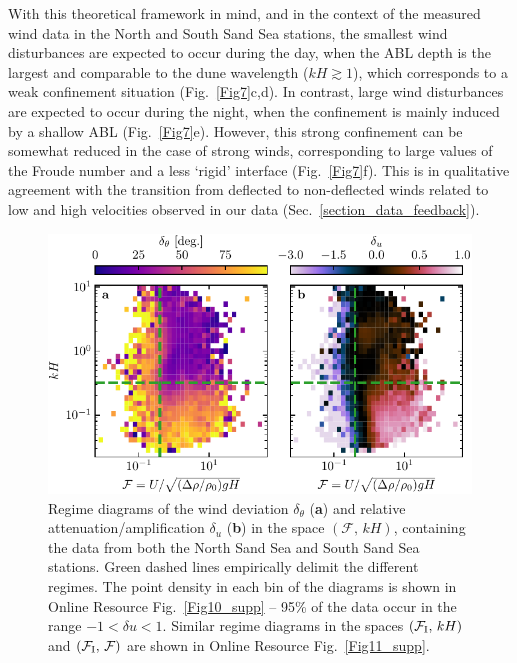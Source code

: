 With this theoretical framework in mind, and in the context of the measured wind data in the North and South Sand Sea stations, the smallest wind disturbances are expected to occur during the day, when the ABL depth is the largest and comparable to the dune wavelength ($k H \gtrsim 1$), which corresponds to a weak confinement situation (Fig.~\ref{Fig7}c,d). In contrast, large wind disturbances are expected to occur during the night, when the confinement is mainly induced by a shallow ABL (Fig.~\ref{Fig7}e). However, this strong confinement can be somewhat reduced in the case of strong winds, corresponding to large values of the Froude number and a less `rigid' interface (Fig.~\ref{Fig7}f). This is in qualitative agreement with the transition from deflected to non-deflected winds related to low and high velocities observed in our data (Sec.~\ref{section_data_feedback}).


\begin{figure}
\centering
\includegraphics[scale=1]{Figures/Figure8.pdf}
\caption{Regime diagrams of the wind deviation $\delta_{\theta}$ (\textbf{a}) and relative attenuation/amplification $\delta_{u}$ (\textbf{b}) in the space $(\mathcal{F}, \, kH)$, containing the data from both the North Sand Sea and South Sand Sea stations. Green dashed lines empirically delimit the different regimes. The point density in each bin of the diagrams is shown in Online Resource Fig.~\ref{Fig10_supp} -- 95\% of the data occur in the range $-1 < \delta u < 1$. Similar regime diagrams in the spaces $(\mathcal{F}_{\textup{I}}, \, kH)$ and $(\mathcal{F}_{\textup{I}}, \, \mathcal{F})$ are shown in Online Resource Fig.~\ref{Fig11_supp}.}
\label{Fig8}
\end{figure}


